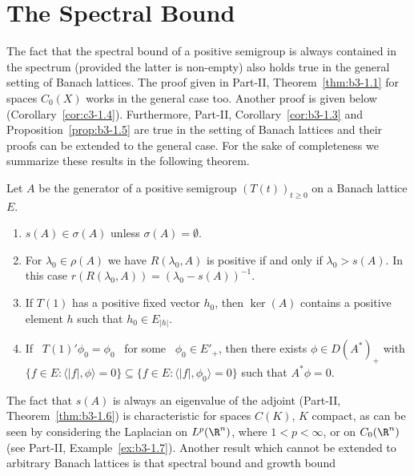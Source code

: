 \section{The Spectral Bound}\label{sec:c3-1}
The fact that the spectral bound of a positive semigroup is always contained in the spectrum (provided the latter  is non-empty) also holds true in the general setting of Banach lattices.
The proof given in Part-II, Theorem~\ref{thm:b3-1.1} for spaces $C_{0}(X)$ works in the general case too.
Another proof is given below (\cf Corollary~\ref{cor:c3-1.4}).
Furthermore, 
Part-II, Corollary~\ref{cor:b3-1.3} and Proposition~\ref{prop:b3-1.5} 
are true in the setting of Banach lattices and their proofs can be extended to the general case.
For the sake of completeness we summarize these results in the following theorem.
\begin{theorem}\label{thm:c3-1.1}
Let $A$ be the generator of a positive semigroup $(T(t))_{t \geq 0}$ on a Banach lattice $E$.
	\begin{enumerate}[\upshape (i)]
		\item 
		$s(A) \in \sigma(A)$ unless $\sigma(A) = \emptyset$.
		
		\item 
		For $\lambda_{0} \in \rho(A)$ we have
		$R(\lambda_{0},A)$ is positive if and only if\/ $\lambda_{0} > s(A)$.
		In this case $r(R(\lambda_{0},A)) = (\lambda_{0} - s(A))^{-1}$.
		
		\item 
		If\/ $T(1)$ has a positive fixed vector $h_{0}$, then $\ker(A)$ contains a positive element $h$ such that $h_{0} \in E_{|h|}$.

		\item 
		If \ $T(1)'\phi_{0} = \phi_{0}$ \ for some \ $\phi_{0} \in E'_{+}$, then there exists $\phi \in D(A^*)_{+}$ with $\{f \in E \colon \langle |f|,\phi\rangle = 0\} \subseteq \{f \in E \colon \langle |f|,\phi_{0}\rangle = 0\}$ such that $A^*\phi = 0$.
	\end{enumerate}
\end{theorem}
The fact that $s(A)$ is always an eigenvalue of the adjoint (\cf Part-II, Theorem~\ref{thm:b3-1.6}) is characteristic for spaces $C(K)$, $K$ compact, as can be seen by considering the Laplacian on $L^p(\R^n)$, where $1 < p < \infty$, or on $C_{0}(\R^n)$ (see Part-II, Example~\ref{ex:b3-1.7}).
Another result which cannot be extended to arbitrary Banach lattices is that spectral bound and growth bound%
